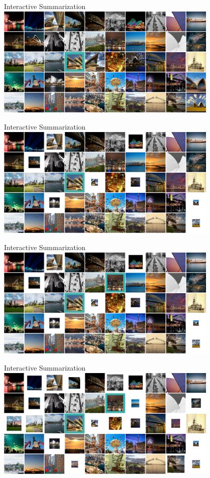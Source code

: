 \documentclass[mathserif]{beamer}
\begin{document}
\begin{frame}{Interactive Summarization}
\vspace{0.5em}
\centering
\includegraphics[width=4.2in]{figures/flickr_probs_1_1.png}
\end{frame}

\begin{frame}{Interactive Summarization}
\vspace{0.5em}
\centering
\includegraphics[width=4.2in]{figures/flickr_probs_1_2.png}
\end{frame}

\begin{frame}{Interactive Summarization}
\vspace{0.5em}
\centering
\includegraphics[width=4.2in]{figures/flickr_probs_2_1.png}
\end{frame}

\begin{frame}{Interactive Summarization}
\vspace{0.5em}
\centering
\includegraphics[width=4.2in]{figures/flickr_probs_2_2.png}
\end{frame}
\end{document}

